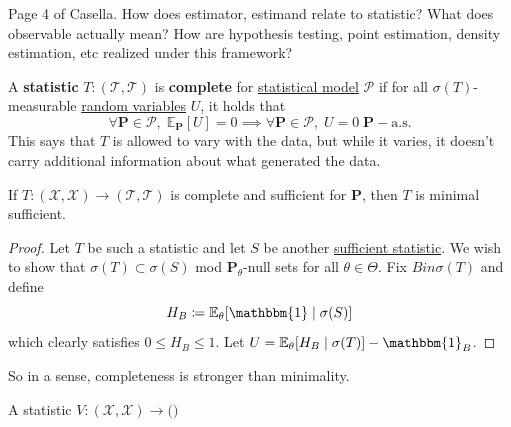  \begin{question}
    Page 4 of Casella. How does estimator, estimand relate to statistic? What does observable actually mean? How are hypothesis testing, point estimation, density estimation, etc realized under this framework? 
  \end{question} 

  \begin{definition}
    \label{def:complete-statistic}
    A \textbf{statistic} $T: (\mathcal{T}, \mathscr{T})$ is \textbf{complete} for \hyperref[def:statistical-model]{statistical model} $\mathcal{P}$ if for all $\sigma(T)$-measurable \hyperref[prob-def:random-variable]{random variables} $U$, it holds that 
    \begin{equation}
      \forall \mathbf{P} \in \mathcal{P}, \; \mathbb{E}_{\mathbf{P}}[U] = 0 \implies \forall \mathbf{P} \in \mathcal{P}, \; U = 0 \; \mathbf{P}-\text{a.s.}
    \end{equation}
    This says that $T$ is allowed to vary with the data, but while it varies, it doesn't carry additional information about what generated the data. 
  \end{definition}

  \begin{theorem}[Bahadur]
    \label{thm:bahadur}
    If $T: (\mathcal{X}, \mathscr{X}) \to (\mathcal{T}, \mathscr{T})$ is complete and sufficient for $\mathbf{P}$, then $T$ is minimal sufficient. 
  \end{theorem}
  \begin{proof}
    Let $T$ be such a statistic and let $S$ be another \hyperref[def:sufficient-statistic]{sufficient statistic}. We wish to show that $\sigma(T) \subset \sigma(S)$ mod $\mathbf{P}_{\theta}$-null sets for all $\theta \in \Theta$. Fix $B in \sigma(T)$ and define 
    \begin{equation}
      H_B \coloneqq \mathbb{E}_{\theta}[ \mathbbm{1} \mid \sigma(S)] 
    \end{equation} 
    which clearly satisfies $0 \leq H_B \leq 1$. Let $U = \mathbb{E}_{\theta} [H_B \mid \sigma(T)] - \mathbbm{1}_B$. 
  \end{proof}

  So in a sense, completeness is stronger than minimality. 

  \begin{definition}[Ancillary]
    \label{def:ancillary}
    A statistic $V: (\mathcal{X}, \mathscr{X})  \to (\mathbf)$
  \end{definition}

